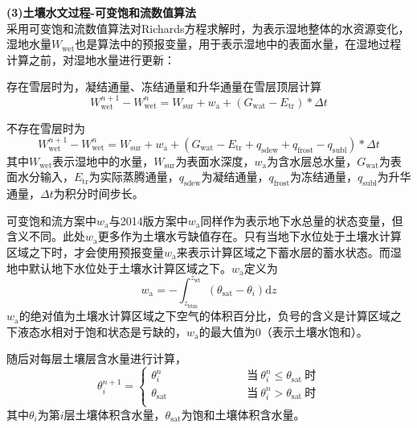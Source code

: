 \textbf {(3)土壤水文过程-可变饱和流数值算法}\\

采用可变饱和流数值算法对Richards方程求解时，为表示湿地整体的水资源变化，湿地水量$W_{\mathrm{wet}}$也是算法中的预报变量，用于表示湿地中的表面水量，在湿地过程计算之前，对湿地水量进行更新：

存在雪层时为，凝结通量、冻结通量和升华通量在雪层顶层计算
\begin{equation}
  W_{\mathrm{wet}}^{n+1}-W_{\mathrm{wet}}^{n}=W_{\mathrm{sur}}+w_{\mathrm{a}}+\left(G_{\mathrm{wat}}-E_{\mathrm{tr}}\right)*{\Delta t}
\end{equation}

不存在雪层时为
\begin{equation}
  W_{\mathrm{wet}}^{n+1}-W_{\mathrm{wet}}^{n}=W_{\mathrm{sur}}+w_{\mathrm{a}}+\left(G_{\mathrm{wat}}-E_{\mathrm{tr}}+q_{\mathrm{sdew}}+q_{\mathrm{frost}}-q_{\mathrm{subl}}\right)*{\Delta t}
\end{equation}
其中$W_{\mathrm{wet}}$表示湿地中的水量，$W_{\mathrm{sur}}$为表面水深度，$w_{\mathrm{a}}$为含水层总水量，$G_{\mathrm{wat}}$为表面水分输入，$E_{\mathrm{tr}}$为实际蒸腾通量，$q_{\mathrm{sdew}}$为凝结通量，$q_{\mathrm{frost}}$为冻结通量，$q_{\mathrm{subl}}$为升华通量，${\Delta t}$为积分时间步长。

可变饱和流方案中$w_{\mathrm {a}} $与2014版方案中$w_{\mathrm {a}} $同样作为表示地下水总量的状态变量，但含义不同。此处$w_{\mathrm {a}} $更多作为土壤水亏缺值存在。只有当地下水位处于土壤水计算区域之下时，才会使用预报变量$w_{\mathrm {a}} $来表示计算区域之下蓄水层的蓄水状态。而湿地中默认地下水位处于土壤水计算区域之下。$w_{\mathrm {a}} $定义为
\begin{equation}
  w_{\mathrm{a}}=-\int_{z_{\mathrm{b t m}}}^{z_{\mathrm{w t}}}\left(\theta_{\mathrm {sat}}-\theta_{i}\right){\mathrm d} z
\end{equation}
$w_{\mathrm {a}} $的绝对值为土壤水计算区域之下空气的体积百分比，负号的含义是计算区域之下液态水相对于饱和状态是亏缺的，$w_{\mathrm {a}} $的最大值为0（表示土壤水饱和）。

随后对每层土壤层含水量进行计算，
\begin{equation}
  \theta_{i}^{n+1}=\begin{cases}
    \theta_{i}^{n} &\qquad \quad \qquad \quad \;\text{当}\ \theta_{i}^{n} \leqslant \theta_{\mathrm {sat}} \ \text{时} \\
    \theta_{\mathrm {sat}}     &\qquad \quad \qquad \quad \;\text{当}\ \theta_{i}^{n} > \theta_{\mathrm {sat}} \ \text{时} \\
  \end{cases}
\end{equation}
其中$\theta_{i}$为第$i$层土壤体积含水量，$\theta_{\mathrm {sat}}$为饱和土壤体积含水量。

